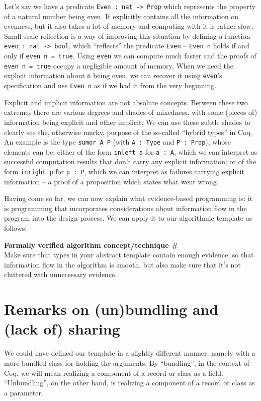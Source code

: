\documentclass[declaration,mgr,english,shortabstract]{iithesis}
\newcommand{\m}[1]{\texttt{#1}}
\newcounter{cnt}
\newcommand{\runcnt}{\#\arabic{cnt}}
\newcommand{\concept}[1]
{
    \refstepcounter{cnt}
    \begin{center}
        \textbf{Formally verified algorithm concept/technique \runcnt} \\
        #1
    \end{center}
}
\begin{document}
Let's say we have a predicate \m{Even\ :\ nat -> Prop} which represents the property of a natural number being even. It explicitly contains all the information on evenness, but it also takes a lot of memory and computing with it is rather slow. Small-scale reflection is a way of improving this situation by defining a function \m{even\ :\ nat -> bool}, which ``reflects'' the predicate \m{Even} -- \m{Even n} holds if and only if \m{even n = true}. Using \m{even} we can compute much faster and the proofs of \m{even n = true} occupy a negligible amount of memory. When we need the explicit information about \m{n} being even, we can recover it using \m{even}'s specification and use \m{Even n} as if we had it from the very beginning.

Explicit and implicit information are not absolute concepts. Between these two extremes there are various degrees and shades of mixedness, with some (pieces of) information being explicit and other implicit. We can use these subtle shades to clearly see the, otherwise murky, purpose of the so-called ``hybrid types'' in Coq. An example is the type \m{sumor A P} (with \m{A\ :\ Type} and \m{P\ :\ Prop}), whose elements can be: either of the form \m{inleft a} for \m{a\ :\ A}, which we can interpret as successful computation results that don't carry any explicit information; or of the form \m{inright p} for \m{p\ :\ P}, which we can interpret as failures carrying explicit information -- a proof of a proposition which states what went wrong.

Having come so far, we can now explain what evidence-based programming is: it is programming that incorporates considerations about information flow in the program into the design process. We can apply it to our algorithmic template as follows:

\concept{Make sure that types in your abstract template contain enough evidence, so that information flow in the algorithm is smooth, but also make sure that it's not cluttered with unnecessary evidence.}

\section{Remarks on (un)bundling and (lack of) sharing}

We could have defined our template in a slightly different manner, namely with a more bundled class for holding the arguments. By ``bundling'', in the context of Coq, we will mean realizing a component of a record or class as a field. ``Unbundling'', on the other hand, is realizing a component of a record or class as a parameter.
\end{document}
